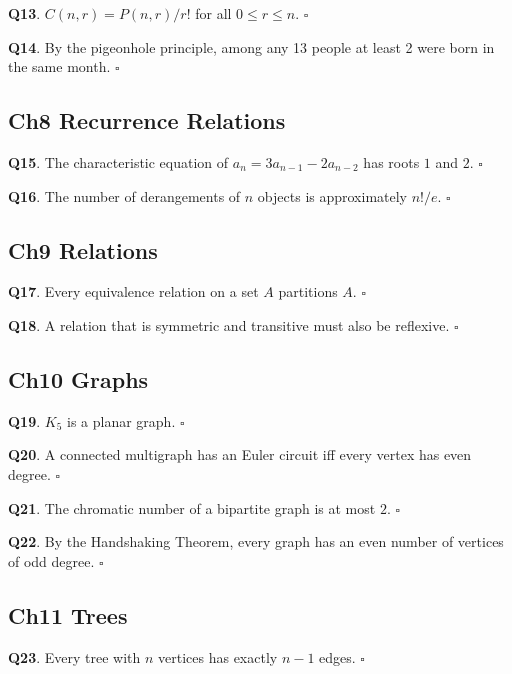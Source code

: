 \documentclass[11pt,a4paper,fontset=mac]{ctexart}
\newcommand{\tfblank}{$\square$}
\newcommand{\question}[1]{\textbf{Q#1}.}
\begin{document}
\question{13}  $C(n,r)=P(n,r)/r!$ for all $0\le r\le n$.
\hfill\tfblank

\question{14}  By the pigeonhole principle, among any 13 people at least
2 were born in the same month.
\hfill\tfblank

\subsection*{Ch8\;\; Recurrence Relations}

\question{15}  The characteristic equation of
$a_n = 3a_{n-1}-2a_{n-2}$ has roots $1$ and $2$.
\hfill\tfblank

\question{16}  The number of derangements of $n$ objects is approximately
$n!/e$.
\hfill\tfblank

\subsection*{Ch9\;\; Relations}

\question{17}  Every equivalence relation on a set $A$ partitions $A$.
\hfill\tfblank

\question{18}  A relation that is symmetric and transitive must also be
reflexive.
\hfill\tfblank

\subsection*{Ch10\;\; Graphs}

\question{19}  $K_{5}$ is a planar graph.
\hfill\tfblank

\question{20}  A connected multigraph has an Euler circuit iff every
vertex has even degree.
\hfill\tfblank

\question{21}  The chromatic number of a bipartite graph is at most $2$.
\hfill\tfblank

\question{22}  By the Handshaking Theorem, every graph has an even number
of vertices of odd degree.
\hfill\tfblank

\subsection*{Ch11\;\; Trees}

\question{23}  Every tree with $n$ vertices has exactly $n-1$ edges.
\hfill\tfblank
\end{document}
